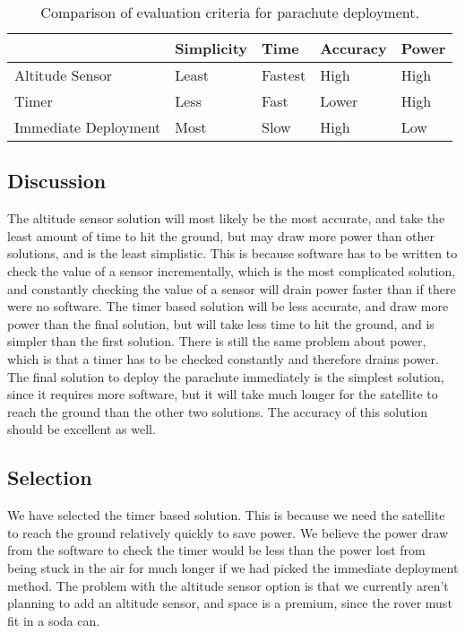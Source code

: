\documentclass[10pt,letterpaper,onecolumn,journal]{IEEEtran}
\begin{document}
\begin{table}[h!]
  \centering
  \caption{Comparison of evaluation criteria for parachute deployment.}
  \label{tab:table1}
  \begin{tabular}{l||l|l|l|l}
                         & Simplicity & Time    & Accuracy & Power\\
    \hline
    Altitude Sensor      & Least      & Fastest & High     & High\\
    \hline
    Timer                & Less       & Fast    & Lower    & High\\
    \hline
    Immediate Deployment & Most       & Slow    & High     & Low\\
  \end{tabular}
\end{table}

\subsection{Discussion}
The altitude sensor solution will most likely be the most accurate, and take the least amount of time to hit the ground, but may draw more power than other solutions, and is the least simplistic. This is because software has to be written to check the value of a sensor incrementally, which is the most complicated solution, and constantly checking the value of a sensor will drain power faster than if there were no software. The timer based solution will be less accurate, and draw more power than the final solution, but will take less time to hit the ground, and is simpler than the first solution. There is still the same problem about power, which is that a timer has to be checked constantly and therefore drains power. The final solution to deploy the parachute immediately is the simplest solution, since it requires more software, but it will take much longer for the satellite to reach the ground than the other two solutions. The accuracy of this solution should be excellent as well.

\subsection{Selection}
We have selected the timer based solution. This is because we need the satellite to reach the ground relatively quickly to save power. We believe the power draw from the software to check the timer would be less than the power lost from being stuck in the air for much longer if we had picked the immediate deployment method. The problem with the altitude sensor option is that we currently aren’t planning to add an altitude sensor, and space is a premium, since the rover must fit in a soda can.
	
\end{document}
